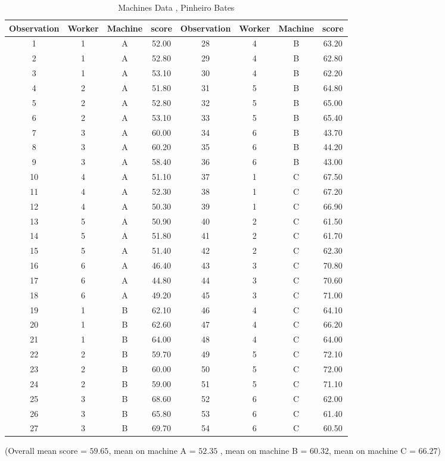 \documentclass[12pt, a4paper]{report}
\theoremstyle{plain}
\theoremstyle{definition}
\theoremstyle{remark}
\begin{document}
\begin{table}[h!]
	\begin{center}
		\begin{tabular}{|c|c|c|c||c|c|c|c|}
			\hline
			Observation & Worker & Machine & score & Observation & Worker & Machine & score \\
			\hline
			1 & 1 & A & 52.00 &	28 & 4 & B & 63.20 \\
			2 & 1 & A & 52.80 &	  29 & 4 & B & 62.80 \\
			3 & 1 & A & 53.10 &	  30 & 4 & B & 62.20 \\
			4 & 2 & A & 51.80 &	  31 & 5 & B & 64.80 \\
			5 & 2 & A & 52.80 &	  32 & 5 & B & 65.00 \\
			6 & 2 & A & 53.10 &	  33 & 5 & B & 65.40 \\
			7 & 3 & A & 60.00 &	  34 & 6 & B & 43.70 \\
			8 & 3 & A & 60.20 &	  35 & 6 & B & 44.20 \\
			9 & 3 & A & 58.40 &	  36 & 6 & B & 43.00 \\
			10 & 4 & A & 51.10 &	  37 & 1 & C & 67.50 \\
			11 & 4 & A & 52.30 &	  38 & 1 & C & 67.20 \\
			12 & 4 & A & 50.30 &	  39 & 1 & C & 66.90 \\
			13 & 5 & A & 50.90 &	  40 & 2 & C & 61.50 \\
			14 & 5 & A & 51.80 &	  41 & 2 & C & 61.70 \\
			15 & 5 & A & 51.40 &	  42 & 2 & C & 62.30 \\
			16 & 6 & A & 46.40 &	  43 & 3 & C & 70.80 \\
			17 & 6 & A & 44.80 &	  44 & 3 & C & 70.60 \\
			18 & 6 & A & 49.20 &	  45 & 3 & C & 71.00 \\
			19 & 1 & B & 62.10 &	  46 & 4 & C & 64.10 \\
			20 & 1 & B & 62.60 &	  47 & 4 & C & 66.20 \\
			21 & 1 & B & 64.00 &	  48 & 4 & C & 64.00 \\
			22 & 2 & B & 59.70 &	  49 & 5 & C & 72.10 \\
			23 & 2 & B & 60.00 &	  50 & 5 & C & 72.00 \\
			24 & 2 & B & 59.00 &	  51 & 5 & C & 71.10 \\
			25 & 3 & B & 68.60 &	  52 & 6 & C & 62.00 \\
			26 & 3 & B & 65.80 &	  53 & 6 & C & 61.40 \\
			27 & 3 & B & 69.70 &	  54 & 6 & C & 60.50 \\
			
			\hline
		\end{tabular}
		\caption{Machines Data , Pinheiro Bates}
	\end{center}
\end{table}
(Overall mean score = $59.65$, mean on machine A = $52.35$ , mean
on machine B = $60.32$, mean on machine C = $66.27$)
\end{document}
